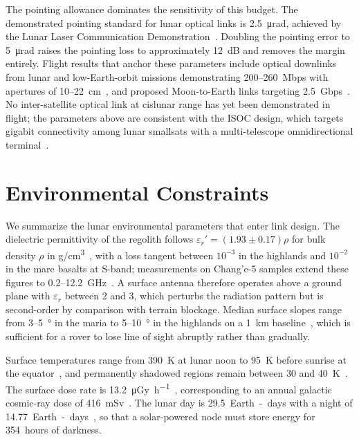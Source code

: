 \documentclass[11pt,a4paper]{article}
\begin{document}
The pointing allowance dominates the sensitivity of this budget. The demonstrated pointing standard for lunar optical links is \SI{2.5}{\micro\radian}, achieved by the Lunar Laser Communication Demonstration~\cite{boroson_llcd}. Doubling the pointing error to \SI{5}{\micro\radian} raises the pointing loss to approximately \SI{12}{dB} and removes the margin entirely. Flight results that anchor these parameters include optical downlinks from lunar and low-Earth-orbit missions demonstrating \SI{200}{}--\SI{260}{Mbps} with apertures of \SI{10}{}--\SI{22}{cm}~\cite{nasa_o2o,tbird_optical}, and proposed Moon-to-Earth links targeting \SI{2.5}{Gbps}~\cite{jaxa_optical_relay}. No inter-satellite optical link at cislunar range has yet been demonstrated in flight; the parameters above are consistent with the ISOC design, which targets gigabit connectivity among lunar smallsats with a multi-telescope omnidirectional terminal~\cite{isoc_2026}.


\section{Environmental Constraints}
\label{sec:environment}

We summarize the lunar environmental parameters that enter link design. The dielectric permittivity of the regolith follows $\varepsilon_r' = (1.93 \pm 0.17)\rho$ for bulk density $\rho$ in \si{g/cm^3}~\cite{olhoeft_strangway1975}, with a loss tangent between $10^{-3}$ in the highlands and $10^{-2}$ in the mare basalts at S-band; measurements on Chang'e-5 samples extend these figures to \SI{0.2}{}--\SI{12.2}{GHz}~\cite{dong_dielectric_ce5}. A surface antenna therefore operates above a ground plane with $\varepsilon_r$ between 2 and 3, which perturbs the radiation pattern but is second-order by comparison with terrain blockage. Median surface slopes range from \SI{3}{}--\SI{5}{\degree} in the maria to \SI{5}{}--\SI{10}{\degree} in the highlands on a \SI{1}{km} baseline~\cite{rosenberg_terrain2011}, which is sufficient for a rover to lose line of sight abruptly rather than gradually.

Surface temperatures range from \SI{390}{K} at lunar noon to \SI{95}{K} before sunrise at the equator~\cite{williams_thermal2017}, and permanently shadowed regions remain between \SI{30}{} and \SI{40}{K}~\cite{paige_psr2010}. The surface dose rate is \SI{13.2}{\micro\gray\per\hour}~\cite{zhang_radiation2020}, corresponding to an annual galactic cosmic-ray dose of \SI{416}{mSv}~\cite{naito_radiation}. The lunar day is \SI{29.5}{Earth-days} with a night of \SI{14.77}{Earth-days}~\cite{lunar_sourcebook}, so that a solar-powered node must store energy for \SI{354}{hours} of darkness.
\end{document}
